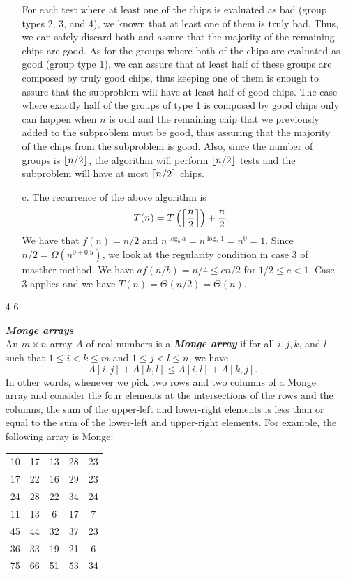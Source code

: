 \begin{enumerate}
\begin{framed}
\begin{enumerate}
      For each test where at least one of the chips is evaluated as bad (group
      types 2, 3, and 4), we known that at least one of them is truly bad. Thus,
      we can safely discard both and assure that the majority of the remaining
      chips are good. As for the groups where both of the chips are evaluated as
      good (group type 1), we can assure that at least half of these groups are
      composed by truly good chips, thus keeping one of them is enough to assure
      that the subproblem will have at least half of good chips. The case where
      exactly half of the groups of type 1 is composed by good chips only can
      happen when $n$ is odd and the remaining chip that we previously added to
      the subproblem must be good, thus assuring that the majority of the chips
      from the subproblem is good. Also, since the number of groups is
      $\lfloor n/2\rfloor$, the algorithm will perform $\lfloor n/2\rfloor$ tests and the
      subproblem will have at most $\lceil n/2\rceil$ chips.
    \item[c.] The recurrence of the above algorithm is
      \[
        T(n) = T\left(\Bigl\lceil\frac{n}{2}\Bigl\rceil\right) + \frac{n}{2}.
      \]
      We have that $f(n) = n/2$ and $n^{\log_b a} = n^{\log_2 1} = n^0 = 1$.
      Since $n/2 = \Omega(n^{0 + 0.5})$, we look at the regularity condition in
      case 3 of masther method. We have $a f(n/b) = n/4 \le c n/2$ for $1/2 \le
      c < 1$. Case 3 applies and we have $T(n) = \Theta(n/2) = \Theta(n)$.
  \end{enumerate}
\end{framed}

\newpage

\item[4{-}6]{\textbf{\emph{Monge arrays}}\\
An $m \times n$ array $A$ of real numbers is a \textbf{\emph{Monge array}} if
for all $i, j, k$, and $l$ such that $1 \le i < k \le m$ and
$1 \le j < l \le n$, we have
\[
  A[i, j] + A[k, l] \le A[i, l] + A[k, j].
\]
In other words, whenever we pick two rows and two columns of a Monge array and
consider the four elements at the intersections of the rows and the columns, the
sum of the upper-left and lower-right elements is less than or equal to the sum
of the lower-left and upper-right elements. For example, the following array is
Monge:

\begin{tabular}{ccccc}
10 & 17 & 13 & 28 & 23\\
17 & 22 & 16 & 29 & 23\\
24 & 28 & 22 & 34 & 24\\
11 & 13 & 6  & 17 & 7\\
45 & 44 & 32 & 37 & 23\\
36 & 33 & 19 & 21 & 6\\
75 & 66 & 51 & 53 & 34
\end{tabular}

}
\end{enumerate}
